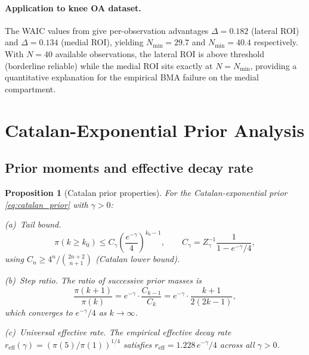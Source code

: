 \documentclass[ba]{imsart}
\theoremstyle{plain}
\newtheorem{proposition}[theorem]{Proposition}
\theoremstyle{definition}
\theoremstyle{remark}
\newcommand{\Nmin}{N_{\min}}
\newcommand{\reff}{r_{\mathrm{eff}}}
\begin{document}
\paragraph{Application to knee OA dataset.}
The WAIC values from \citet{schetinin2025} give per-observation advantages
$\Delta = 0.182$ (lateral ROI) and $\Delta = 0.134$ (medial ROI),
yielding $\Nmin = 29.7$ and $\Nmin = 40.4$ respectively.
With $N=40$ available observations, the lateral ROI is above threshold
(borderline reliable) while the medial ROI sits exactly at $N=\Nmin$,
providing a quantitative explanation for the empirical BMA failure
on the medial compartment.

\section{Catalan-Exponential Prior Analysis}
\label{sec:catalan}

\subsection{Prior moments and effective decay rate}

\begin{proposition}[Catalan prior properties]\label{prop:catalan_tail}
  For the Catalan-exponential prior \eqref{eq:catalan_prior} with $\gamma > 0$:

  \smallskip\noindent
  \textup{(a)}~\emph{Tail bound.}
  \begin{equation}
    \pi(k \geq k_0) \leq C_\gamma
    \left(\frac{e^{-\gamma}}{4}\right)^{k_0-1},
    \qquad
    C_\gamma = Z_\gamma^{-1} \frac{1}{1-e^{-\gamma}/4},
    \label{eq:tail_bound}
  \end{equation}
  using $C_n \geq 4^n / \binom{2n+2}{n+1}$ (Catalan lower bound).

  \smallskip\noindent
  \textup{(b)}~\emph{Step ratio.}
  The ratio of successive prior masses is
  \begin{equation}
    \frac{\pi(k+1)}{\pi(k)}
    = e^{-\gamma} \cdot \frac{C_{k-1}}{C_k}
    = e^{-\gamma} \cdot \frac{k+1}{2(2k-1)},
    \label{eq:step_ratio}
  \end{equation}
  which converges to $e^{-\gamma}/4$ as $k\to\infty$.

  \smallskip\noindent
  \textup{(c)}~\emph{Universal effective rate.}
  The empirical effective decay rate $\reff(\gamma)
  = (\pi(5)/\pi(1))^{1/4}$
  satisfies $\reff = 1.228\,e^{-\gamma}/4$ across all $\gamma > 0$.
\end{proposition}
\end{document}
